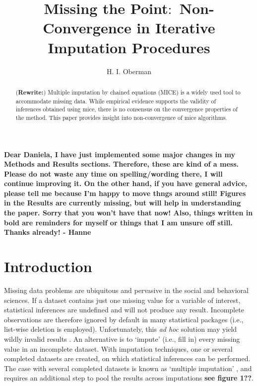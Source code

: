 \documentclass[Royal,times,sageh]{sagej}
\begin{document}
\title{Missing the Point\(\colon\) Non-Convergence in Iterative Imputation
Procedures}


\author{H. I. Oberman}




\begin{abstract}
(\textbf{Rewrite:}) Multiple imputation by chained equations (MICE) is a
widely used tool to accommodate missing data. While empirical evidence
supports the validity of inferences obtained using mice, there is no
consensus on the convergence properties of the method. This paper
provides insight into non-convergence of mice algorithms.
\end{abstract}


\maketitle

\textbf{Dear Daniela, I have just implemented some major changes in my
Methods and Results sections. Therefore, these are kind of a mess.
Please do not waste any time on spelling/wording there, I will continue
improving it. On the other hand, if you have general advice, please tell
me because I'm happy to move thngs around still! Figures in the Results
are currently missing, but will help in understanding the paper. Sorry
that you won't have that now! Also, things written in bold are reminders
for myself or things that I am unsure off still. Thanks already! -
Hanne}

\hypertarget{introduction}{%
\section{Introduction}\label{introduction}}

Missing data problems are ubiquitous and pervasive in the social and
behavioral sciences. If a dataset contains just one missing value for a
variable of interest, statistical inferences are undefined and will not
produce any result. Incomplete observations are therefore ignored by
default in many statistical packages (i.e., list-wise deletion is
employed). Unfortunately, this \emph{ad hoc} solution may yield wildly
invalid results \citep{buur18}. An alternative is to `impute' (i.e.,
fill in) every missing value in an incomplete dataset. With imputation
techniques, one or several completed datasets are created, on which
statistical inferences can be performed. The case with several completed
datasets is known as `multiple imputation' \citep[MI;][]{rubin76}, and
requires an additional step to pool the results across imputations
\textbf{see figure 1??}.
\end{document}

